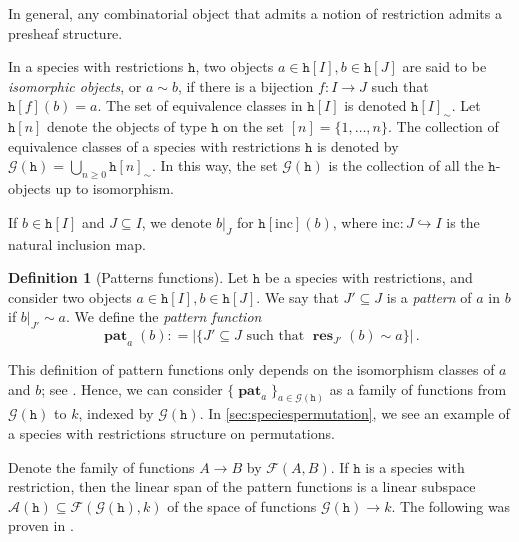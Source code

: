 \documentclass[12pt, reqno]{amsart}
\theoremstyle{definition}
\newtheorem{defin}[thm]{Definition}
\DeclareMathOperator{\rest}{\mathbf{res}}
\DeclareMathOperator{\pat}{\mathbf{pat}}
\begin{document}
In general, any combinatorial object that admits a notion of restriction admits a presheaf structure.


In a species with restrictions $\mathtt{h}$, two objects $a\in \mathtt{h}[I], b\in \mathtt{h}[J]$ are said to be \textit{isomorphic objects}, or $a\sim b$, if there is a bijection $f:I\to J$ such that $\mathtt{h}[f](b)=a$.
The set of equivalence classes in $\mathtt{h}[I]$ is denoted $\mathtt{h}[I]_{\sim}$.
Let $\mathtt{h}[n]$ denote the objects of type $\mathtt{h}$ on the set $[n] = \{1, \dots , n\}$.
The collection of equivalence classes of a species with restrictions $\mathtt{h}$ is denoted by $\mathcal{G}(\mathtt{h}) = \bigcup_{n\geq 0 } \mathtt{h}[n]_{\sim }$.
In this way, the set $\mathcal G(\mathtt{h}) $ is the collection of all the $\mathtt{h}$-objects up to isomorphism.

If $b \in \mathtt{h}[I]$ and $J \subseteq I$, we denote $b|_J$ for $\mathtt{h}[\mathrm{inc}](b)$, where $\mathrm{inc}: J \hookrightarrow I$ is the natural inclusion map.

\begin{defin}[Patterns functions]\label{defin:pattern}
Let $\mathtt{h}$ be a species with restrictions, and consider two objects $a\in \mathtt{h}[I], b\in \mathtt{h}[J]$.
We say that $J'\subseteq J $ is a \textit{pattern} of $a$ in $b$ if $b|_{J'} \sim a$.
We define the \textit{pattern function} $$\pat_a( b) : = \left| \{J' \subseteq J \text{ such that } \rest_{J'}(b) \sim a \} \right| \,  . $$

\end{defin}



This definition of pattern functions only depends on the isomorphism classes of $a$ and $b$; see \cite{Penaguiao2020}.
Hence, we can consider $\{ \pat_a \}_{a\in \mathcal{G}(\mathtt{h})}$ as a family of functions from $\mathcal{G}(\mathtt{h})$ to $k$, indexed by $\mathcal{G}(\mathtt{h})$.
In \cref{sec:speciespermutation}, we see an example of a species with restrictions structure on permutations.

Denote the family of functions $A \to B$ by $\mathcal{F} (A, B)$.
If $\mathtt{h}$ is a species with restriction, then the linear span of the pattern functions  is a linear subspace $\mathcal{A}(\mathtt{h}) \subseteq \mathcal{F}(\mathcal{G}(\mathtt{h}) , k) $ of the space of functions $\mathcal{G}(\mathtt{h}) \to k$.
The following was proven in \cite{Penaguiao2020}.
\end{document}
